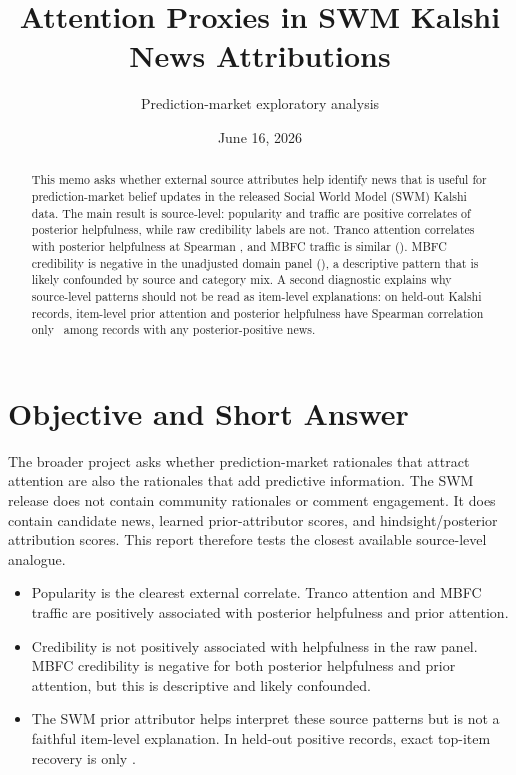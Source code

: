\documentclass[11pt]{article}
\title{Attention Proxies in SWM Kalshi News Attributions}
\author{Prediction-market exploratory analysis}
\date{June 16, 2026}
\begin{document}
\maketitle
\begin{abstract}
This memo asks whether external source attributes help identify news that is useful for prediction-market belief updates in the released Social World Model (SWM) Kalshi data. The main result is source-level: popularity and traffic are positive correlates of posterior helpfulness, while raw credibility labels are not. Tranco attention correlates with posterior helpfulness at Spearman \TrancoPosteriorSpearman, and MBFC traffic is similar (\MBFCTrafficPosteriorSpearman). MBFC credibility is negative in the unadjusted domain panel (\MBFCCredibilityPosteriorSpearman), a descriptive pattern that is likely confounded by source and category mix. A second diagnostic explains why source-level patterns should not be read as item-level explanations: on held-out Kalshi records, item-level prior attention and posterior helpfulness have Spearman correlation only \TestItemPositiveRecordSpearman\ among records with any posterior-positive news.
\end{abstract}
\section{Objective and Short Answer}
The broader project asks whether prediction-market rationales that attract attention are also the rationales that add predictive information. The SWM release does not contain community rationales or comment engagement. It does contain candidate news, learned prior-attributor scores, and hindsight/posterior attribution scores. This report therefore tests the closest available source-level analogue.
\begin{itemize}
\item Popularity is the clearest external correlate. Tranco attention and MBFC traffic are positively associated with posterior helpfulness and prior attention.
\item Credibility is not positively associated with helpfulness in the raw panel. MBFC credibility is negative for both posterior helpfulness and prior attention, but this is descriptive and likely confounded.
\item The SWM prior attributor helps interpret these source patterns but is not a faithful item-level explanation. In held-out positive records, exact top-item recovery is only \TestPriorExactTopRate.
\end{itemize}
\end{document}
